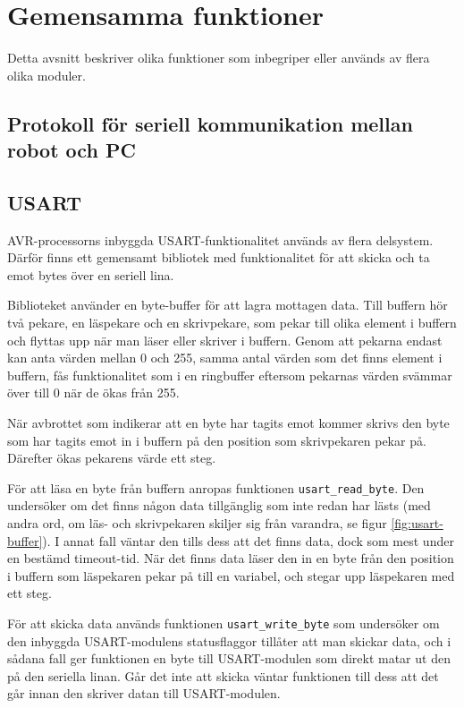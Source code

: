 \documentclass[a4paper,12pt]{article}
\begin{document}
\section{Gemensamma funktioner}
Detta avsnitt beskriver olika funktioner som inbegriper eller används av flera olika moduler.

\subsection{Protokoll för seriell kommunikation mellan robot och PC}
\label{sec:bt-protokoll}

\subsection{USART}
\label{sec:usart}
AVR-processorns inbyggda USART-funktionalitet används av flera delsystem. Därför finns ett gemensamt bibliotek med funktionalitet för att skicka och ta emot bytes över en seriell lina.

Biblioteket använder en byte-buffer för att lagra mottagen data. Till buffern hör två pekare, en läspekare och en skrivpekare, som pekar till olika element i buffern och flyttas upp när man läser eller skriver i buffern. Genom att pekarna endast kan anta värden mellan 0 och 255, samma antal värden som det finns element i buffern, fås funktionalitet som i en ringbuffer eftersom pekarnas värden svämmar över till 0 när de ökas från 255.

När avbrottet som indikerar att en byte har tagits emot kommer skrivs den byte som har tagits emot in i buffern på den position som skrivpekaren pekar på. Därefter ökas pekarens värde ett steg.


För att läsa en byte från buffern anropas funktionen \verb|usart_read_byte|. Den undersöker om det finns någon data tillgänglig som inte redan har lästs (med andra ord, om läs- och skrivpekaren skiljer sig från varandra, se figur \ref{fig:usart-buffer}). I annat fall väntar den tills dess att det finns data, dock som mest under en bestämd timeout-tid. När det finns data läser den in en byte från den position i buffern som läspekaren pekar på till en variabel, och stegar upp läspekaren med ett steg.

För att skicka data används funktionen \verb|usart_write_byte| som undersöker om den inbyggda USART-modulens statusflaggor tillåter att man skickar data, och i sådana fall ger funktionen en byte till USART-modulen som direkt matar ut den på den seriella linan. Går det inte att skicka väntar funktionen till dess att det går innan den skriver datan till USART-modulen.
\end{document}
